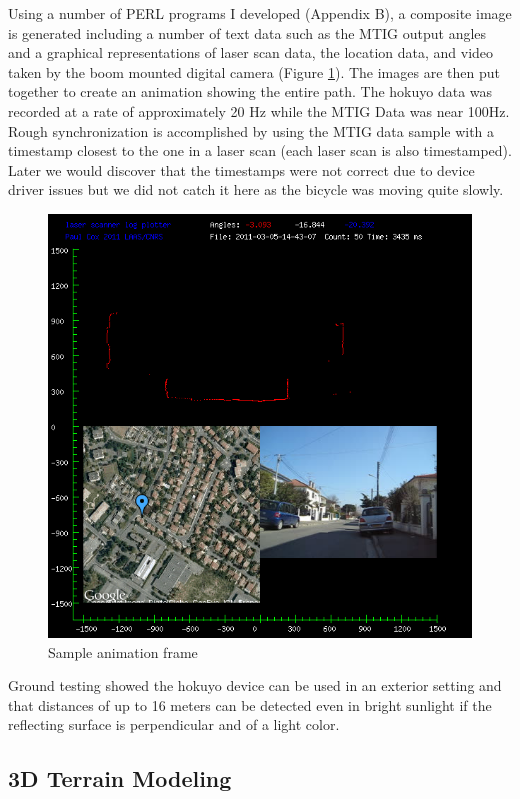 \documentclass[a4paper,11pt]{report}
\begin{document}
Using a number of PERL programs I developed (Appendix B), a composite image is generated including a number of text data such as the MTIG output angles and a graphical representations of laser scan data, the location data, and video taken by the boom mounted digital camera (Figure \ref{fig:plotlogsample}). The images are then put together to create an animation showing the entire path. The hokuyo data was recorded at a rate of approximately 20 Hz while the MTIG Data was near 100Hz. Rough synchronization is accomplished by using the MTIG data sample with a timestamp closest to the one in a laser scan (each laser scan is also timestamped). Later we would discover that the timestamps were not correct due to device driver issues but we did not catch it here as the bicycle was moving quite slowly.

\begin{figure}[ht]
 \centering
 \includegraphics[width=12cm]{Plotlogsample.png}
 \caption{Sample animation frame}
 \label{fig:plotlogsample}
\end{figure}

Ground testing showed the hokuyo device can be used in an exterior setting and that distances of up to 16 meters can be detected even in bright sunlight if the reflecting surface is perpendicular and of a light color.

\subsection{3D Terrain Modeling}
\end{document}
